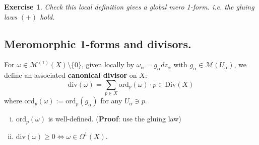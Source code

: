 \documentclass{article}
\newtheorem{exercise}{Exercise}
\begin{document}
\begin{exercise}
Check this local definition gives a global mero 1-form.
i.e. the gluing laws $(+)$ hold.
\end{exercise}

\subsection{Meromorphic 1-forms and divisors.}

\begin{definition}
For $\omega \in \mathcal{M}^{(1)}(X) \setminus \{0\}$, given locally by $\omega_\alpha = g_\alpha dz_\alpha$ with $g_\alpha \in \mathcal{M}(U_\alpha)$, we define an associated \textbf{canonical divisor} on $X$:
$$\mathrm{div}(\omega) = \sum_{p \in X} \mathrm{ord}_p(\omega) \cdot p \in \mathrm{Div}(X)$$
where $\mathrm{ord}_p(\omega) := \mathrm{ord}_p(g_\alpha)$ for any $U_\alpha \ni p$.
\end{definition}

\begin{lemma}
\begin{enumerate}[(i)]
    \item $\mathrm{ord}_p(\omega)$ is well-defined. (\textbf{Proof}: use the gluing law)
    \item $\mathrm{div}(\omega) \ge 0 \iff \omega \in \Omega^1(X)$.
\end{enumerate}
\end{lemma}
\end{document}

